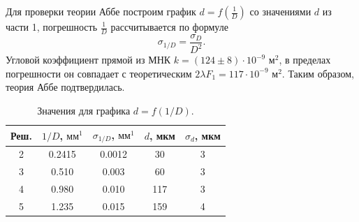\documentclass[a4paper,12pt]{article}
\begin{document}
Для проверки теории Аббе построим график $d = f(\frac{1}{D})$ со значениями $d$ из части 1, погрешность $\frac{1}{D}$ рассчитывается по формуле
$$
\sigma_{1/D} = \dfrac{\sigma_D}{D^2}.
$$
Угловой коэффициент прямой из МНК $k = (124 \pm 8) \cdot 10^{-9} \text{ м}^2$, в пределах погрешности он совпадает с теоретическим $2\lambda F_1 = 117 \cdot 10^{-9} \text{ м}^2$. Таким образом, теория Аббе подтвердилась.
\begin{table}[h]
\begin{tabular}{|c|c|c|c|c|}
\hline
Реш. & $1/D$, $\text{мм}^1$ & $\sigma_{1/D}$, $\text{мм}^1$ & $d$, мкм & $\sigma_d$, мкм \\ \hline
2    & 0.2415               & 0.0012                        & 30       & 3               \\ \hline
3    & 0.510                & 0.003                         & 60       & 3               \\ \hline
4    & 0.980                & 0.010                         & 117      & 3               \\ \hline
5    & 1.235                & 0.015                         & 159      & 4               \\ \hline
\end{tabular}
\centering
\caption{Значения для графика $d = f(1/D)$.}
\end{table}
\newpage
\end{document}
